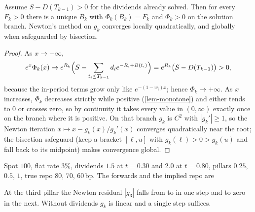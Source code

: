 \begin{proposition}\label{prop-bootstrap}
Assume $S-D(T_{k-1})>0$ for the dividends already solved. Then for every $F_k>0$ there is a unique $B_k$ with
$\Phi_k(B_k)=F_k$ and $\Phi_k>0$ on the solution branch. Newton's method on $g_k$ converges locally quadratically,
and globally when safeguarded by bisection.
\end{proposition}
\begin{proof}
As $x\to-\infty$,
\[
e^{x}\Phi_k(x)\to e^{R_k}\Bigl(S-\sum_{t_i\le T_{k-1}}d_ie^{-R_i+B(t_i)}\Bigr)=e^{R_k}\bigl(S-D(T_{k-1})\bigr)>0,
\]
because the in-period terms grow only like $e^{-(1-w_i)x}$; hence $\Phi_k\to+\infty$. As $x$ increases, $\Phi_k$
decreases strictly while positive (\cref{lem-monotone}) and either tends to $0$ or crosses zero, so by continuity
it takes every value in $(0,\infty)$ exactly once on the branch where it is positive. On that branch $g_k$ is
$C^2$ with $|g_k'|\ge1$, so the Newton iteration $x\mapsto x-g_k(x)/g_k'(x)$ converges quadratically near the root;
the bisection safeguard (keep a bracket $[\ell,u]$ with $g_k(\ell)>0>g_k(u)$ and fall back to its midpoint) makes
convergence global.
\end{proof}

\begin{example}\label{ex-bootstrap}
Spot $100$, flat rate $3\%$, dividends $1.5$ at $t=0.30$ and $2.0$ at $t=0.80$, pillars $0.25$, $0.5$, $1$, true
repo $80$, $70$, $60$\,bp. The forwards and the implied repo are
\begin{center}\end{center}
At the third pillar the Newton residual $|g_3|$ falls from \vNewtonA{} to \vNewtonB{} in one step and to zero in the
next. Without dividends $g_k$ is linear and a single step suffices.
\end{example}

